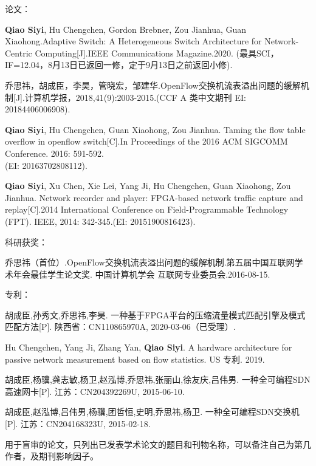 
{}




\noindent 论文：
\begin{publist}
	\item \textbf{Qiao Siyi}, Hu Chengchen, Gordon Brebner, Zou Jianhua, Guan Xiaohong.Adaptive Switch: A Heterogeneous Switch Architecture for Network-Centric Computing[J].IEEE Communications Magazine.2020.
	(最具SCI，IF=12.04，8月13日已返回一修，定于9月13日之前返回小修).
	\item {\hei 乔思祎}，胡成臣，李昊，管晓宏，邹建华.OpenFlow交换机流表溢出问题的缓解机制[J].计算机学报，2018,41(9):2003-2015.(CCF A 类中文期刊 EI: 20184406006908).
	\item \textbf{Qiao Siyi}, Hu Chengchen, Guan Xiaohong, Zou Jianhua. Taming the flow table overflow in openflow switch[C].In Proceedings of the 2016 ACM SIGCOMM Conference. 2016: 591-592.\\
	(EI: 20163702808112).
	\item \textbf{Qiao Siyi}, Xu Chen, Xie Lei, Yang Ji, Hu Chengchen, Guan Xiaohong, Zou Jianhua. Network recorder and player: FPGA-based network traffic capture and replay[C].2014 International Conference on Field-Programmable Technology (FPT). IEEE, 2014: 342-345.(EI: 20151900816423).
\end{publist}

\noindent 科研获奖：
\begin{publist}
	\item {\hei 乔思祎}（首位）.OpenFlow交换机流表溢出问题的缓解机制.第五届中国互联网学术年会最佳学生论文奖. 中国计算机学会 互联网专业委员会.2016-08-15.
\end{publist}

\noindent 专利：
\begin{publist}
	
	\item 胡成臣,孙秀文,{\hei 乔思祎},李昊. 一种基于FPGA平台的压缩流量模式匹配引擎及模式匹配方法[P]. 陕西省：CN110865970A, 2020-03-06（已受理）.
	\item Hu Chengchen, Yang Ji, Zhang Yan, \textbf{Qiao Siyi}. A hardware architecture for passive network measurement based on flow statistics. US 专利. 2019.
	\item 胡成臣,杨骥,龚志敏,杨卫,赵泓博,{\hei 乔思祎},张丽山,徐友庆,吕伟男. 一种全可编程SDN高速网卡[P]. 江苏：CN204392269U, 2015-06-10. 
	\item 胡成臣,赵泓博,吕伟男,杨骥,团哲恒,史明,{\hei 乔思祎},杨卫. 一种全可编程SDN交换机[P]. 江苏：CN204168323U, 2015-02-18.
\end{publist}






\vspace{\baselineskip}
{\color{red} 用于盲审的论文，只列出已发表学术论文的题目和刊物名称，可以备注自己为第几作者，及期刊影响因子。}

\clearpage{\pagestyle{empty}\cleardoublepage}%
